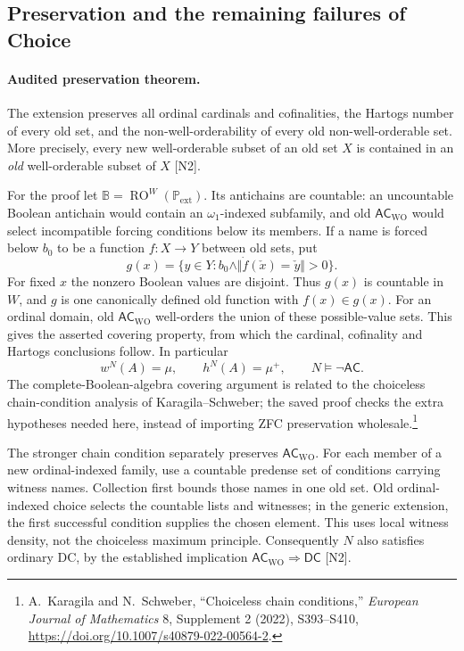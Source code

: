 \subsection{Preservation and the remaining failures of Choice}

\paragraph{Audited preservation theorem.}
The extension preserves all ordinal cardinals and cofinalities, the
Hartogs number of every old set, and the non-well-orderability of every
old non-well-orderable set.  More precisely, every new well-orderable
subset of an old set $X$ is contained in an \emph{old} well-orderable
subset of $X$ [N2].

For the proof let $\mathbb B=\operatorname{RO}^W(\mathbb P_{\mathrm{ext}})$.
Its antichains are countable: an uncountable Boolean antichain would
contain an $\omega_1$-indexed subfamily, and old
$\mathsf{AC}_{\mathrm{WO}}$ would select incompatible forcing conditions
below its members.  If a name is forced below $b_0$ to be a function
$f:X\to Y$ between old sets, put
\[
 g(x)=\{y\in Y:b_0\wedge\Vert\dot f(\check x)=\check y\Vert>0\}.
\]
For fixed $x$ the nonzero Boolean values are disjoint.  Thus $g(x)$ is
countable in $W$, and $g$ is one canonically defined old function with
$f(x)\in g(x)$.  For an ordinal domain, old
$\mathsf{AC}_{\mathrm{WO}}$ well-orders the union of these possible-value
sets.  This gives the asserted covering property, from which the
cardinal, cofinality and Hartogs conclusions follow.  In particular
\[
                w^N(A)=\mu,\qquad h^N(A)=\mu^+,
                \qquad N\models\neg\mathsf{AC}.
\]
The complete-Boolean-algebra covering argument is related to the
choiceless chain-condition analysis of Karagila--Schweber; the saved
proof checks the extra hypotheses needed here, instead of importing
ZFC preservation wholesale.\footnote{A.~Karagila and N.~Schweber,
``Choiceless chain conditions,'' \emph{European Journal of Mathematics}
8, Supplement 2 (2022), S393--S410,
\url{https://doi.org/10.1007/s40879-022-00564-2}.}

The stronger chain condition separately preserves
$\mathsf{AC}_{\mathrm{WO}}$.  For each member of a new ordinal-indexed
family, use a countable predense set of conditions carrying witness
names.  Collection first bounds those names in one old set.  Old
ordinal-indexed choice selects the countable lists and witnesses;
in the generic extension, the first successful condition supplies the
chosen element.  This uses local witness density, not the choiceless
maximum principle.  Consequently $N$ also satisfies ordinary DC,
by the established implication $\mathsf{AC}_{\mathrm{WO}}\Rightarrow
\mathsf{DC}$ [N2].

